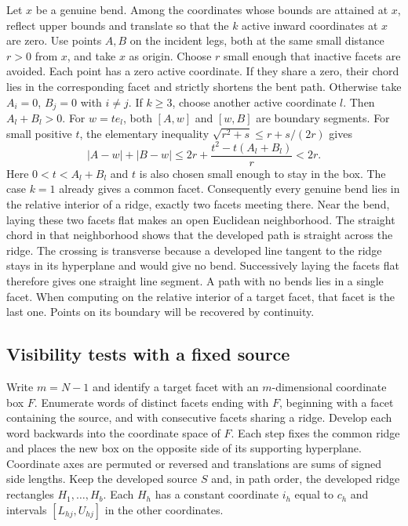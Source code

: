 \documentclass[10pt,letterpaper]{article}
\begin{document}
Let $x$ be a genuine bend. Among the coordinates whose bounds are attained at
$x$, reflect upper bounds and translate so that the $k$ active inward
coordinates at $x$ are zero. Use points $A,B$ on the incident legs, both at
the same small distance $r>0$ from $x$, and take $x$ as origin. Choose $r$
small enough that inactive facets are avoided. Each point has a zero active
coordinate. If they share a zero, their chord lies in the corresponding facet
and strictly shortens the bent path. Otherwise take $A_i=0$, $B_j=0$ with
$i\ne j$. If $k\ge3$, choose another active coordinate $l$. Then
$A_l+B_l>0$. For $w=t e_l$, both $[A,w]$ and $[w,B]$ are boundary segments.
For small positive $t$, the elementary inequality
$\sqrt{r^2+s}\le r+s/(2r)$ gives
\[
 |A-w|+|B-w|
 \le 2r+\frac{t^2-t(A_l+B_l)}r <2r .
\]
Here $0<t<A_l+B_l$ and $t$ is also chosen small enough to stay in the
box. The case $k=1$ already gives a common facet. Consequently every
genuine bend lies in the relative interior of a ridge, exactly two
facets meeting there. Near the bend, laying these two facets flat makes
an open Euclidean neighborhood. The straight chord in that neighborhood
shows that the developed path is straight across the ridge. The crossing is transverse because a developed line tangent to the ridge stays in its
hyperplane and would give no bend. Successively laying the facets flat
therefore gives one straight line segment. A path with no bends lies in a
single facet. When computing on the relative interior of a target facet,
that facet is the last one. Points on its boundary will be recovered by
continuity.

\subsection{Visibility tests with a fixed source}
Write $m=N-1$ and identify a target facet with an $m$-dimensional coordinate
box $F$. Enumerate words of distinct facets ending with $F$, beginning with
a facet containing the source, and with consecutive facets sharing a ridge.
Develop each word backwards into the coordinate space of $F$. Each step
fixes the common ridge and places the new box on the opposite side of its
supporting hyperplane. Coordinate axes are permuted or reversed and
translations are sums of signed side lengths. Keep the developed source $S$
and, in path order, the developed ridge rectangles $H_1,\ldots,H_b$.
Each $H_h$ has a constant coordinate $i_h$ equal to $c_h$ and intervals
$[L_{hj},U_{hj}]$ in the other coordinates.
\end{document}

